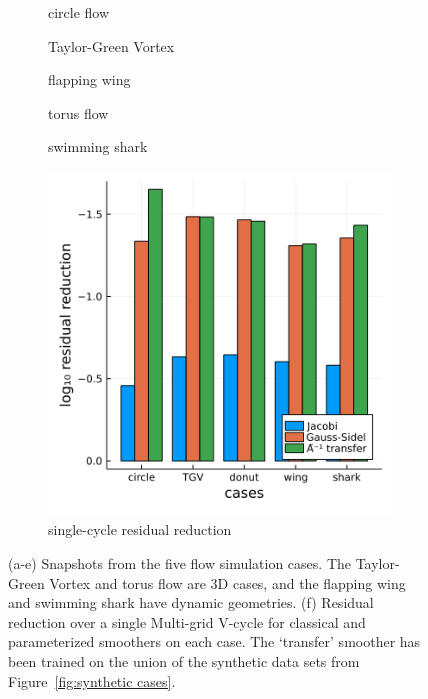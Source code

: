\documentclass[review]{elsarticle}
\begin{document}
\begin{figure}
    \centering
    \begin{subfigure}[b]{0.3\textwidth}
        \centering
        \caption{circle flow}
        \label{fig:circle}
    \end{subfigure}
    \begin{subfigure}[b]{0.3\textwidth}
        \centering
        \caption{Taylor-Green Vortex}
        \label{fig:TGV}
    \end{subfigure}
    \begin{subfigure}[b]{0.3\textwidth}
        \centering
        \caption{flapping wing}
        \label{fig:donut}
    \end{subfigure}
    \begin{minipage}{0.47\textwidth}
        \begin{subfigure}{\textwidth}
        \centering
        \caption{torus flow}
        \label{fig:donut}
        \end{subfigure}
        \begin{subfigure}{\textwidth}
        \centering
        \caption{swimming shark}
        \label{fig:donut}
        \end{subfigure}
    \end{minipage}
    \hfill
    \begin{subfigure}[b]{0.47\textwidth}
        \centering
        \includegraphics[width=\textwidth]{figures/compareloss.png}
        \caption{single-cycle residual reduction}
        \label{fig:simulation residual}
    \end{subfigure}
    \caption{(a-e) Snapshots from the five flow simulation cases. The Taylor-Green Vortex and torus flow are 3D cases, and the flapping wing and swimming shark have dynamic geometries. (f) Residual reduction over a single Multi-grid V-cycle for classical and parameterized smoothers on each case. The `transfer' smoother has been trained on the union of the synthetic data sets from Figure~\ref{fig:synthetic cases}.}
    \label{fig:simulation cases}
\end{figure}
\end{document}
